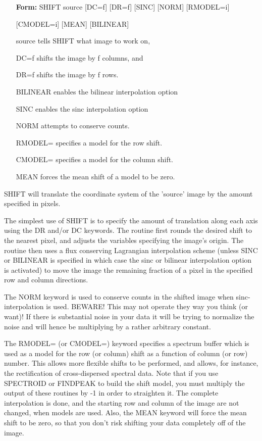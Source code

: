 \begin{itemize}
  \item[\textbf{Form: }SHIFT source {[DC=f]} {[DR=f]} {[SINC]} {[NORM]} 
       {[RMODEL=i]}\hfill]{}
  \item[]{{[CMODEL=i]} {[MEAN]} {[BILINEAR]}}
  \item[source]{tells SHIFT what image to work on,}
  \item[DC=f]{shifts the image by f columns, and}
  \item[DR=f]{shifts the image by f rows.}
  \item[BILINEAR]{enables the bilinear interpolation option}
  \item[SINC]{enables the sinc interpolation option}
  \item[NORM]{attempts to conserve counts.}
  \item[RMODEL=]{specifies a model for the row shift.}
  \item[CMODEL=]{specifies a model for the column shift.}
  \item[MEAN]{forces the mean shift of a model to be zero.}
\end{itemize}

SHIFT will translate the coordinate system of the 'source' image by 
the amount specified in pixels.  

The simplest use of SHIFT is to specify the amount of translation along
each axis using the DR and/or DC keywords.  The routine first rounds the
desired shift to the nearest pixel, and adjusts the variables specifying
the image's origin. The routine then uses a flux conserving Lagrangian
interpolation scheme (unless SINC or BILINEAR is specified in which case
the sinc or bilinear interpolation option is activated) to move the image
the remaining fraction of a pixel in the specified row and column
directions.

The NORM keyword is used to conserve counts in the shifted image when sinc-
interpolation is used.  BEWARE! This may not operate they way you think (or
want)!  If there is substantial noise in your data it will be trying to
normalize the noise and will hence be multiplying by a rather arbitrary
constant.

The RMODEL= (or CMODEL=) keyword specifies a spectrum buffer which is used
as a model for the row (or column) shift as a function of column (or row)
number.  This allows more flexible shifts to be performed, and allows, for
instance, the rectification of cross-dispersed spectral data.  Note that if
you use SPECTROID or FINDPEAK to build the shift model, you must multiply
the output of these routines by -1 in order to straighten it.  The complete
interpolation is done, and the starting row and column of the image are not
changed, when models are used.  Also, the MEAN keyword will force the mean
shift to be zero, so that you don't risk shifting your data completely off
of the image.

